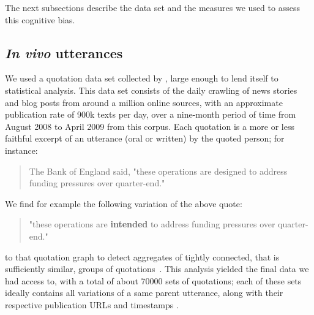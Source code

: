 The next subsections describe the data set and the measures we used to assess this cognitive bias.

\subsection{\emph{In vivo} utterances}

We used a quotation data set collected by \citet{leskovec_meme-tracking_2009}, large enough to lend itself to statistical analysis.
This data set consists of the daily crawling of news stories and blog posts from around a million online sources, with an approximate publication rate of 900k texts per day, over a nine-month period of time from August 2008 to April 2009 
 from this corpus.
Each quotation is a more or less faithful excerpt of an utterance (oral or written) by the quoted person; for instance:
\begin{quote}
The Bank of England said, "these operations are designed to address funding pressures over quarter-end."
\end{quote}

We find for example the following variation of the above quote:
\begin{quote}
"these operations are \textbf{intended} to address funding pressures over quarter-end."
\end{quote}
 to that quotation graph to detect aggregates of tightly connected, that is sufficiently similar, groups of quotations~\citep[see again][for more details]{leskovec_meme-tracking_2009}.
This analysis yielded the final data we had access to, with a total of about \num{70000} sets of quotations; each of these sets ideally contains all variations of a same parent utterance, along with their respective publication URLs and timestamps .

